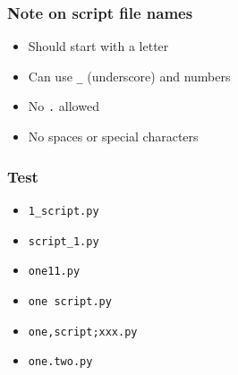 \documentclass[14pt,compress]{beamer}
\newcommand{\typ}[1]{\lstinline{#1}}
\begin{document}
\begin{frame}[fragile]
  \frametitle{Note on script file names}
  \begin{itemize}
  \item Should start with a letter
  \item Can use \typ{_} (underscore) and numbers
  \item No \typ{.} allowed
  \item No spaces or special characters
  \end{itemize}
\end{frame}

\begin{frame}[fragile]
  \frametitle{Test}
  \begin{itemize}
  \item \typ{1_script.py}
  \item \typ{script_1.py}
  \item \typ{one11.py}
  \item \typ{one script.py}
  \item \typ{one,script;xxx.py}
  \item \typ{one.two.py}
  \end{itemize}
\end{frame}
\end{document}
